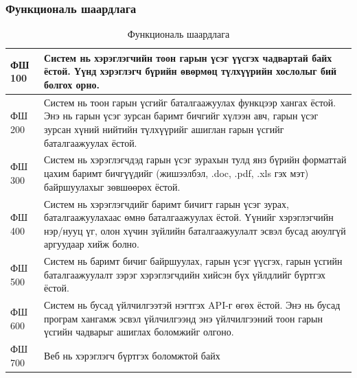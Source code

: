 \subsubsection{Функциональ шаардлага}
\begin{table}[h]
	\centering
	\caption{Функциональ шаардлага}
	\begin{tabular}{ |p{2cm}|p{13cm}| }
		\hline
		ФШ 100 & Систем нь хэрэглэгчийн тоон гарын үсэг үүсгэх чадвартай байх ёстой. Үүнд хэрэглэгч бүрийн өвөрмөц түлхүүрийн хослолыг бий болгох орно.                                                                             \\ \hline
		ФШ 200 & Систем нь тоон гарын үсгийг баталгаажуулах функцээр хангах ёстой. Энэ нь гарын үсэг зурсан баримт бичгийг хүлээн авч, гарын үсэг зурсан хүний нийтийн түлхүүрийг ашиглан гарын үсгийг баталгаажуулах ёстой.        \\ \hline
		ФШ 300 & Систем нь хэрэглэгчдэд гарын үсэг зурахын тулд янз бүрийн форматтай цахим баримт бичгүүдийг (жишээлбэл, .doc, .pdf, .xls гэх мэт) байршуулахыг зөвшөөрөх ёстой.                                                    \\ \hline
		ФШ 400 & Систем нь хэрэглэгчдийг баримт бичигт гарын үсэг зурах, баталгаажуулахаас өмнө баталгаажуулах ёстой. Үүнийг хэрэглэгчийн нэр/нууц үг, олон хүчин зүйлийн баталгаажуулалт эсвэл бусад аюулгүй аргуудаар хийж болно. \\ \hline
		ФШ 500 & Систем нь баримт бичиг байршуулах, гарын үсэг үүсгэх, гарын үсгийн баталгаажуулалт зэрэг хэрэглэгчдийн хийсэн бүх үйлдлийг бүртгэх ёстой.                                                                          \\ \hline
		ФШ 600 & Систем нь бусад үйлчилгээтэй нэгтгэх API-г өгөх ёстой. Энэ нь бусад програм хангамж эсвэл үйлчилгээнд энэ үйлчилгээний тоон гарын үсгийн чадварыг ашиглах боломжийг олгоно.                                        \\  \hline
		ФШ 700 & Веб нь хэрэглэгч бүртгэх боломжтой байх                                                                                                                                                                            \\ \hline
	\end{tabular}
\end{table}

